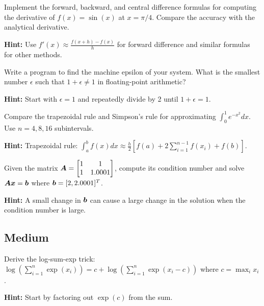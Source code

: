 \begin{problem}
\label{prob:numerical-diff}
Implement the forward, backward, and central difference formulas for computing the derivative of $f(x) = \sin(x)$ at $x = \pi/4$. Compare the accuracy with the analytical derivative.

\textbf{Hint:} Use $f'(x) \approx \frac{f(x+h) - f(x)}{h}$ for forward difference and similar formulas for other methods.
\end{problem}

\begin{problem}
\label{prob:machine-epsilon}
Write a program to find the machine epsilon of your system. What is the smallest number $\epsilon$ such that $1 + \epsilon \neq 1$ in floating-point arithmetic?

\textbf{Hint:} Start with $\epsilon = 1$ and repeatedly divide by 2 until $1 + \epsilon = 1$.
\end{problem}

\begin{problem}
\label{prob:numerical-integration}
Compare the trapezoidal rule and Simpson's rule for approximating $\int_0^1 e^{-x^2} dx$. Use $n = 4, 8, 16$ subintervals.

\textbf{Hint:} Trapezoidal rule: $\int_a^b f(x)dx \approx \frac{h}{2}[f(a) + 2\sum_{i=1}^{n-1}f(x_i) + f(b)]$.
\end{problem}

\begin{problem}
\label{prob:matrix-conditioning}
Given the matrix $\boldsymbol{A} = \begin{bmatrix} 1 & 1 \\ 1 & 1.0001 \end{bmatrix}$, compute its condition number and solve $\boldsymbol{A}\boldsymbol{x} = \boldsymbol{b}$ where $\boldsymbol{b} = [2, 2.0001]^T$.

\textbf{Hint:} A small change in $\boldsymbol{b}$ can cause a large change in the solution when the condition number is large.
\end{problem}

\subsection*{Medium}

\begin{problem}
\label{prob:log-sum-exp}
Derive the log-sum-exp trick: $\log\left(\sum_{i=1}^n \exp(x_i)\right) = c + \log\left(\sum_{i=1}^n \exp(x_i - c)\right)$ where $c = \max_i x_i$.

\textbf{Hint:} Start by factoring out $\exp(c)$ from the sum.
\end{problem}

